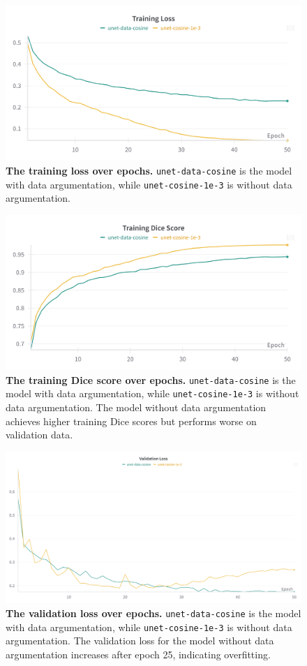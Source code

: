 \documentclass[twocolumn,a4paper]{article}
\begin{document}
\begin{figure}[H]
\centering
\includegraphics[width=0.95\linewidth]{figs/aug_unet_train_loss}
\caption{\textbf{The training loss over epochs.} \texttt{unet-data-cosine} is the model with data argumentation, while \texttt{unet-cosine-1e-3} is without data argumentation.}
\label{fig:augunettrainloss}
\end{figure}
\begin{figure}[H]
\centering
\includegraphics[width=0.95\linewidth]{figs/aug_unet_train_dice}
\caption{\textbf{The training Dice score over epochs.} \texttt{unet-data-cosine} is the model with data argumentation, while \texttt{unet-cosine-1e-3} is without data argumentation. The model without data argumentation achieves higher training Dice scores but performs worse on validation data.}
\label{fig:augunettraindice}
\end{figure}
\begin{figure}[H]
\centering
\includegraphics[width=0.95\linewidth]{figs/aug_unet_val_loss}
\caption{\textbf{The validation loss over epochs.} \texttt{unet-data-cosine} is the model with data argumentation, while \texttt{unet-cosine-1e-3} is without data argumentation. The validation loss for the model without data argumentation increases after epoch 25, indicating overfitting.}
\label{fig:augunetvalloss}
\end{figure}
\end{document}
